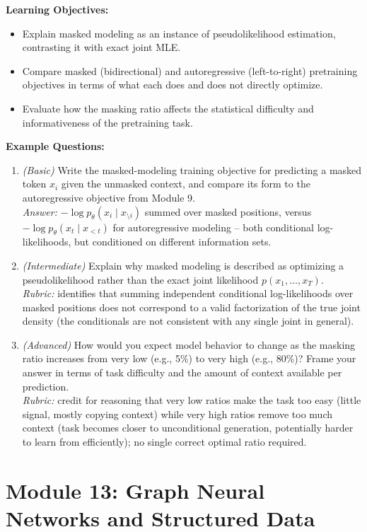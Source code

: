 \documentclass[11pt]{article}
\begin{document}
\textbf{Learning Objectives:}
\begin{itemize}
  \item Explain masked modeling as an instance of pseudolikelihood estimation, contrasting it with exact joint MLE.
  \item Compare masked (bidirectional) and autoregressive (left-to-right) pretraining objectives in terms of what each does and does not directly optimize.
  \item Evaluate how the masking ratio affects the statistical difficulty and informativeness of the pretraining task.
\end{itemize}

\textbf{Example Questions:}
\begin{enumerate}
  \item \textit{(Basic)} Write the masked-modeling training objective for predicting a masked token $x_i$ given the unmasked context, and compare its form to the autoregressive objective from Module 9. \\
  \textit{Answer:} $-\log p_\theta(x_i \mid x_{\setminus i})$ summed over masked positions, versus $-\log p_\theta(x_t \mid x_{<t})$ for autoregressive modeling -- both conditional log-likelihoods, but conditioned on different information sets.
  \item \textit{(Intermediate)} Explain why masked modeling is described as optimizing a pseudolikelihood rather than the exact joint likelihood $p(x_1,\ldots,x_T)$. \\
  \textit{Rubric:} identifies that summing independent conditional log-likelihoods over masked positions does not correspond to a valid factorization of the true joint density (the conditionals are not consistent with any single joint in general).
  \item \textit{(Advanced)} How would you expect model behavior to change as the masking ratio increases from very low (e.g., 5\%) to very high (e.g., 80\%)? Frame your answer in terms of task difficulty and the amount of context available per prediction. \\
  \textit{Rubric:} credit for reasoning that very low ratios make the task too easy (little signal, mostly copying context) while very high ratios remove too much context (task becomes closer to unconditional generation, potentially harder to learn from efficiently); no single correct optimal ratio required.
\end{enumerate}

\section{Module 13: Graph Neural Networks and Structured Data}
\end{document}
